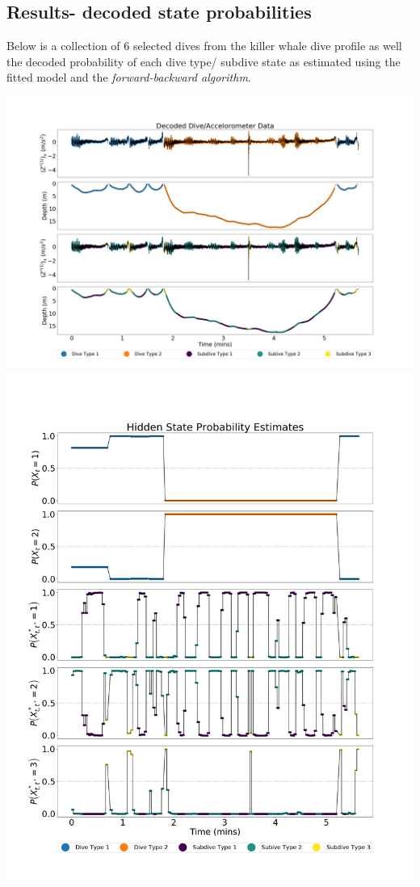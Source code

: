 \documentclass[12pt]{TD-CJS}
\begin{document}
\subsection{Results- decoded state probabilities}

Below is a collection of 6 selected dives from the killer whale dive profile as well the decoded probability of each dive type/ subdive state as estimated using the fitted model and the \textit{forward-backward algorithm}.

\includegraphics[width=5.5in]{../Plots/decoded_data.png}
\newpage
\includegraphics[width=5.5in]{../Plots/decoded_states.png}
\end{document}
